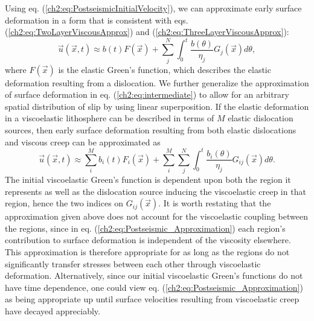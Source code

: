 Using eq. (\ref{ch2:eq:PostseismicInitialVelocity}), we can approximate
early surface deformation in a form that is consistent with
eqs. (\ref{ch2:eq:TwoLayerViscousApprox}) and
(\ref{ch2:eq:ThreeLayerViscousApprox}):
\begin{equation}\label{ch2:eq:intermediate}
\vec{u}(\vec{x},t) \approx 
b(t)F(\vec{x}) + \sum_j^N\int_0^t
\frac{b(\theta)}{\eta_j}G_j(\vec{x}) d\theta,
\end{equation}
where $F(\vec{x})$ is the elastic Green's function, which describes the
elastic deformation resulting from a dislocation.  We further
generalize the approximation of surface deformation in
eq. (\ref{ch2:eq:intermediate}) to allow for an arbitrary spatial
distribution of slip by using linear superposition.  If the elastic
deformation in a viscoelastic lithosphere can be described in terms of
$M$ elastic dislocation sources, then early surface deformation
resulting from both elastic dislocations and viscous creep can be
approximated as 
\begin{equation}\label{ch2:eq:Postseismic_Approximation}
\vec{u}(\vec{x},t) \approx 
\sum_i^Mb_i(t)F_i(\vec{x}) +
\sum_i^M\sum_j^N\int_0^t\frac{b_i(\theta)}{\eta_j}G_{ij}(\vec{x}) d\theta.
\end{equation}
The initial viscoelastic Green's function is dependent upon both the
region it represents as well as the dislocation source inducing the
viscoelastic creep in that region, hence the two indices on
$G_{ij}(\vec{x})$.  It is worth restating that the approximation given
above does not account for the viscoelastic coupling between the
regions, since in eq. (\ref{ch2:eq:Postseismic_Approximation}) each region's
contribution to surface deformation is independent of the viscosity
elsewhere.  This approximation is therefore appropriate for as long as
the regions do not significantly transfer stresses between each other
through viscoelastic deformation.  Alternatively, since our initial
viscoelastic Green's functions do not have time dependence, one could
view eq. (\ref{ch2:eq:Postseismic_Approximation}) as being appropriate up
until surface velocities resulting from viscoelastic creep have
decayed appreciably.

